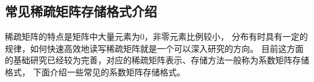 \begin{comment}

\subsubsection{多重网格}

\begin{table}
\centering
\caption{不同求解算法求解2维Poisson问题需要的计算量\cite{trottenberg2000multigrid}}
\begin{minipage}{.7\linewidth}
\centering
\begin{tabular}{lc}
\topline
求解方法 & 需要的计算量\footnote{记N为未知元数量。}\\
\midline
高斯消去 & $\mathcal{O}(N^2)$\\
Jacobi迭代 & $\mathcal{O}(N^2\log\epsilon)$\\
Gauss-Seidel迭代 & $\mathcal{O}(N^2\log\epsilon)$\\
超松弛迭代 & $\mathcal{O}(N^{3/2}\log\epsilon)$\\
CG & $\mathcal{O}(N^{3/2}\log\epsilon)$\\
IC CG & $\mathcal{O}(N^{5/4}\log\epsilon)$\\
ADI & $\mathcal{O}(N\log N)$\\
完全多重网格法 & $\mathcal{O}(N)$\\
\bottomline
\end{tabular}
\end{minipage}
\end{table}

\end{comment}

\subsection{常见稀疏矩阵存储格式介绍}
\label{sec:gpu.sparseformat}

稀疏矩阵的特点是矩阵中大量元素为0，非零元素比例较小，
分布有时具有一定的规律，如何快速高效地读写稀疏矩阵就是一个可以深入研究的方向。
目前这方面的基础研究已经较为完善，对应的稀疏矩阵表示、存储方法一般称为系数矩阵存储格式，
下面介绍一些常见的系数矩阵存储格式。

